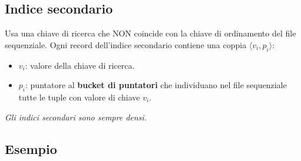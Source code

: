 \documentclass[a4paper, 10pt]{article}
\theoremstyle{definition}
\begin{document}
		\subsection*{Indice secondario}
		Usa una chiave di ricerca che NON coincide con la chiave
		di ordinamento del file sequenziale.
		Ogni record dell'indice secondario contiene una coppia
		$\langle v_i, p_i \rangle$:
		\begin{itemize}
			\item $ v_i $: valore della chiave di ricerca.
			\item $ p_i $: puntatore al \textbf{bucket di puntatori} che individuano nel file sequenziale
			tutte le tuple con valore di chiave $ v_i $.
		\end{itemize}
		\textit{Gli indici secondari sono sempre densi.}
		
		\subsection*{Esempio}
		
\end{document}
